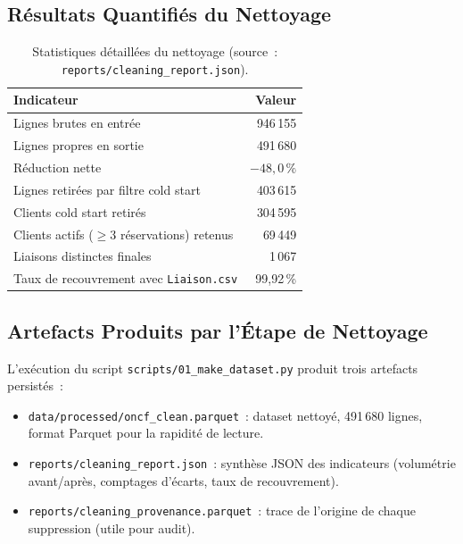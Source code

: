 \documentclass[11pt, a4paper]{article}
\begin{document}
\subsection{Résultats Quantifiés du Nettoyage}

\begin{table}[h]
\centering
\small
\begin{tabularx}{\textwidth}{|X|r|}
\hline
\textbf{Indicateur} & \textbf{Valeur} \\
\hline
Lignes brutes en entrée                       & 946\,155 \\
\hline
Lignes propres en sortie                      & 491\,680 \\
\hline
Réduction nette                               & $-48{,}0\,\%$ \\
\hline
Lignes retirées par filtre cold start         & 403\,615 \\
\hline
Clients cold start retirés                    & 304\,595 \\
\hline
Clients actifs ($\geq 3$ réservations) retenus & 69\,449 \\
\hline
Liaisons distinctes finales                   & 1\,067 \\
\hline
Taux de recouvrement avec \texttt{Liaison.csv} & 99{,}92\,\% \\
\hline
\end{tabularx}
\caption{Statistiques détaillées du nettoyage (source~:
\texttt{reports/cleaning\_report.json}).}
\end{table}

\subsection{Artefacts Produits par l'Étape de Nettoyage}

L'exécution du script \texttt{scripts/01\_make\_dataset.py} produit
trois artefacts persistés~:
\begin{itemize}
\item \texttt{data/processed/oncf\_clean.parquet}~: dataset nettoyé,
    491\,680 lignes, format Parquet pour la rapidité de lecture.
\item \texttt{reports/cleaning\_report.json}~: synthèse JSON des
    indicateurs (volumétrie avant/après, comptages d'écarts, taux de
    recouvrement).
\item \texttt{reports/cleaning\_provenance.parquet}~: trace de
    l'origine de chaque suppression (utile pour audit).
\end{itemize}
\end{document}
